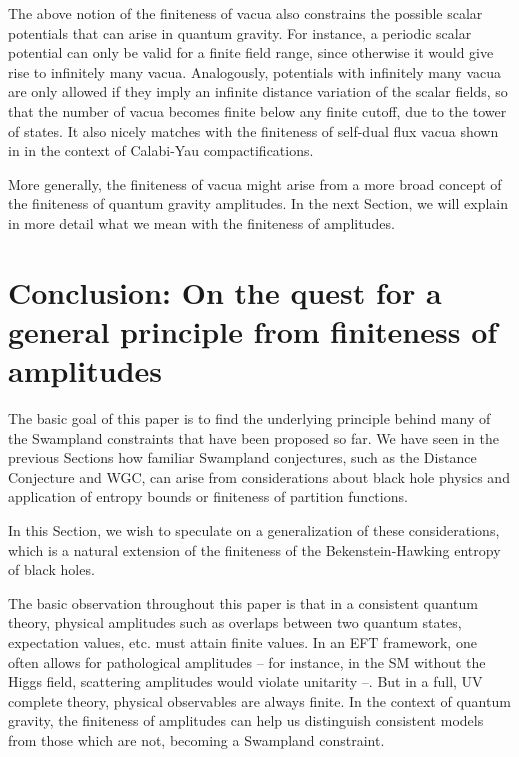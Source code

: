 \documentclass[11pt]{article}
\numberwithin{equation}{section}
\newcommand{\fixme}[1]{{\bf {\color{blue}[#1]}}}
\numberwithin{equation}{section}
\theoremstyle{remark}
\begin{document}
The above notion of the finiteness of vacua also constrains the possible scalar potentials that can arise in quantum gravity. For instance, a periodic scalar potential can only be valid for a finite field range, since otherwise it would give rise to infinitely many vacua. Analogously, potentials with infinitely many vacua are only allowed if they imply an infinite distance variation of the scalar fields, so that the number of vacua becomes finite below any finite cutoff, due to the tower of states. It also nicely matches with the finiteness of self-dual flux vacua shown in \cite{Grimm:2020cda} in the context of Calabi-Yau compactifications.

More generally, the finiteness of vacua might arise from a more broad concept of the finiteness of quantum gravity amplitudes. %
In the next Section, we will explain in more detail what we mean with the finiteness of amplitudes.



\section{Conclusion: On the quest for a general principle from finiteness of amplitudes}
\label{sec:finiteness}

The basic goal of this paper is to find the underlying principle behind many of the Swampland constraints that have been proposed so far. We have seen in the previous Sections how familiar Swampland conjectures, such as the Distance Conjecture and WGC, can arise from considerations about black hole physics and application of entropy bounds or finiteness of partition functions. 

In this Section, we wish to speculate on a generalization of these considerations, which is a natural extension of the finiteness of the Bekenstein-Hawking entropy of black holes.

The basic observation throughout this paper is that in a consistent quantum theory, physical amplitudes such as overlaps between two quantum states, expectation values, etc. must attain finite values. In an EFT framework, one often allows for pathological amplitudes -- for instance, in the SM without the Higgs field, scattering amplitudes would violate unitarity \cite{Cornwall:1974km,LlewellynSmith:1973yud} --. But in a full, UV complete theory, physical observables are always finite. In the context of quantum gravity, the finiteness of amplitudes can help us distinguish consistent models from those which are not, becoming a Swampland constraint. 
\end{document}
